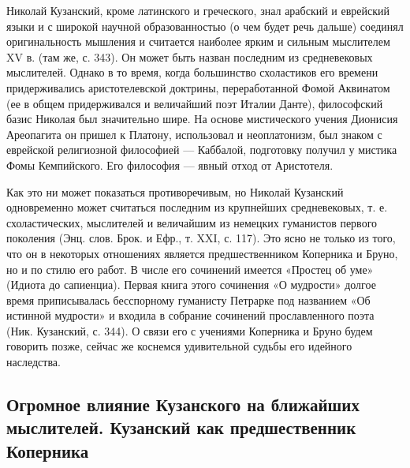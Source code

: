Николай  Кузанский, кроме  латинского  и греческого,  знал арабский  и
еврейский языки и с широкой  научной образованностью (о чем будет речь
дальше) соединял оригинальность мышления  и считается наиболее ярким и
сильным  мыслителем XV  в.  (там же,  с. 343).  Он  может быть  назван
последним  из  средневековых  мыслителей.  Однако в  то  время,  когда
большинство  схоластиков  его времени  придерживались  аристотелевской
доктрины,  переработанной Фомой  Аквинатом (ее  в общем  придерживался
и  величайший  поэт  Италии  Данте),  философский  базис  Николая  был
значительно шире. На основе мистического учения Дионисия Ареопагита он
пришел к Платону,  использовал и неоплатонизм, был  знаком с еврейской
религиозной философией --- Каббалой, подготовку получил у мистика Фомы
Кемпийского. Его философия --- явный отход от Аристотеля.

Как  это  ни может  показаться  противоречивым,  но Николай  Кузанский
одновременно может считаться последним из крупнейших средневековых, т.
е.  схоластических, мыслителей  и  величайшим  из немецких  гуманистов
первого  поколения (Энц.  слов. Брок.  и Ефр.,  т. XXI,  с. 117).  Это
ясно  не  только из  того,  что  он  в некоторых  отношениях  является
предшественником  Коперника  и Бруно,  но  и  по  стилю его  работ.  В
числе его  сочинений имеется «Простец  об уме» (Идиота  до сапиенциа).
Первая книга  этого сочинения «О мудрости»  долгое время приписывалась
бесспорному гуманисту Петрарке под  названием «Об истинной мудрости» и
входила в собрание сочинений  прославленного поэта (Ник. Кузанский, с.
344). О связи  его с учениями Коперника и Бруно  будем говорить позже,
сейчас же коснемся удивительной судьбы его идейного наследства.

\subsection{Огромное  влияние  Кузанского   на  ближайших  мыслителей.
Кузанский как предшественник Коперника}

